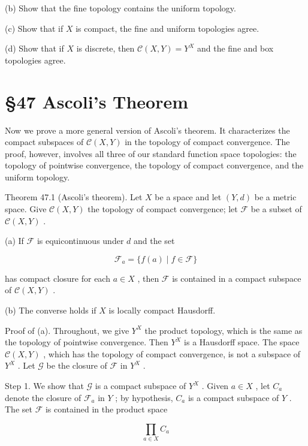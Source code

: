 \documentclass[10pt]{article}
\begin{document}
(b) Show that the fine topology contains the uniform topology.

(c) Show that if \(X\) is compact, the fine and uniform topologies agree.

(d) Show that if \(X\) is discrete, then \(\mathcal{C}\left( {X,Y}\right)  = {Y}^{X}\) and the fine and box topologies agree.

\section*{§47 Ascoli's Theorem}

Now we prove a more general version of Ascoli's theorem. It characterizes the compact subspaces of \(\mathcal{C}\left( {X,Y}\right)\) in the topology of compact convergence. The proof, however, involves all three of our standard function space topologies: the topology of pointwise convergence, the topology of compact convergence, and the uniform topology.

Theorem 47.1 (Ascoli’s theorem). Let \(X\) be a space and let \(\left( {Y,d}\right)\) be a metric space. Give \(\mathcal{C}\left( {X,Y}\right)\) the topology of compact convergence; let \(\mathcal{F}\) be a subset of \(\mathcal{C}\left( {X,Y}\right)\) .

(a) If \(\mathcal{F}\) is equicontinuous under \(d\) and the set

\[
{\mathcal{F}}_{a} = \{ f\left( a\right)  \mid  f \in  \mathcal{F}\}
\]

has compact closure for each \(a \in  X\) , then \(\mathcal{F}\) is contained in a compact subspace of \(\mathcal{C}\left( {X,Y}\right)\) .

(b) The converse holds if \(X\) is locally compact Hausdorff.

Proof of (a). Throughout, we give \({Y}^{X}\) the product topology, which is the same as the topology of pointwise convergence. Then \({Y}^{X}\) is a Hausdorff space. The space \(\mathcal{C}\left( {X,Y}\right)\) , which has the topology of compact convergence, is not a subspace of \({Y}^{X}\) . Let \(\mathcal{G}\) be the closure of \(\mathcal{F}\) in \({Y}^{X}\) .

Step 1. We show that \(\mathcal{G}\) is a compact subspace of \({Y}^{X}\) . Given \(a \in  X\) , let \({C}_{a}\) denote the closure of \({\mathcal{F}}_{a}\) in \(Y\) ; by hypothesis, \({C}_{a}\) is a compact subspace of \(Y\) . The set \(\mathcal{F}\) is contained in the product space

\[
\mathop{\prod }\limits_{{a \in  X}}{C}_{a}
\]
\end{document}
